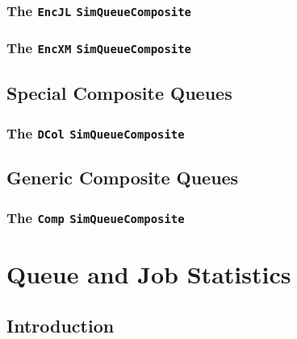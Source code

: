 \documentclass[12pt]{book}
\begin{document}
\subsection{The \lstinline{EncJL} \lstinline{SimQueueComposite}}
\label{sec:EncJL}

\subsection{The \lstinline{EncXM} \lstinline{SimQueueComposite}}
\label{sec:EncXM}

\section{Special Composite Queues}

\subsection{The \lstinline|DCol| \lstinline{SimQueueComposite}}
\label{sec:DCol}

\section{Generic Composite Queues}

\subsection{The \lstinline{Comp} \lstinline{SimQueueComposite}}
\label{sec:Comp}

\chapter{Queue and Job Statistics}
\label{sec:statistics}

\section{Introduction}
\label{stat-intro}
\end{document}
